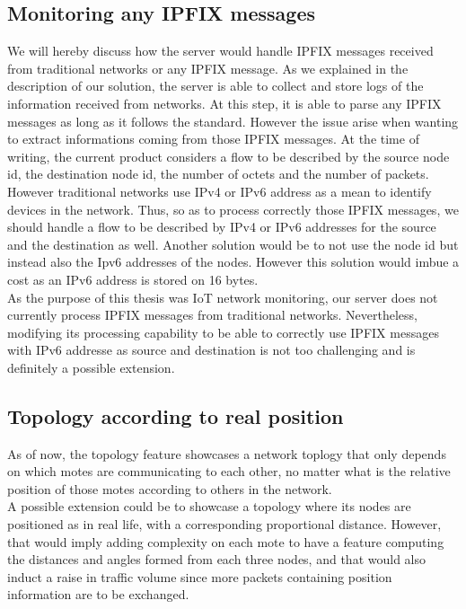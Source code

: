 \subsection*{Monitoring any IPFIX messages}

We will hereby discuss how the server would handle IPFIX messages received from traditional networks or any IPFIX message. As we explained in the description of our solution, the server is able to collect and store logs of the information received from networks. At this step, it is able to parse any IPFIX messages as long as it follows the standard. However the issue arise when wanting to extract informations coming from those IPFIX messages. At the time of writing, the current product considers a flow to be described by the source node id, the destination node id, the number of octets and the number of packets. However traditional networks use IPv4 or IPv6 address as a mean to identify devices in the network. Thus, so as to process correctly those IPFIX messages, we should handle a flow to be described by IPv4 or IPv6 addresses for the source and the destination as well. Another solution would be to not use the node id but instead also the Ipv6 addresses of the nodes. However this solution would imbue a cost as an IPv6 address is stored on 16 bytes. \\

As the purpose of this thesis was IoT network monitoring, our server does not currently process IPFIX messages from traditional networks. Nevertheless, modifying its processing capability to be able to correctly use IPFIX messages with IPv6 addresse as source and destination is not too challenging and is definitely a possible extension. \\

\subsection*{Topology according to real position}

As of now, the topology feature showcases a network toplogy that only depends on which motes are communicating to each other, no matter what is the relative position of those motes according to others in the network. \\

A possible extension could be to showcase a topology where its nodes are positioned as in real life, with a corresponding proportional distance. However, that would imply adding complexity on each mote to have a feature computing the distances and angles formed from each three nodes, and that would also induct a raise in traffic volume since more packets containing position information are to be exchanged.

